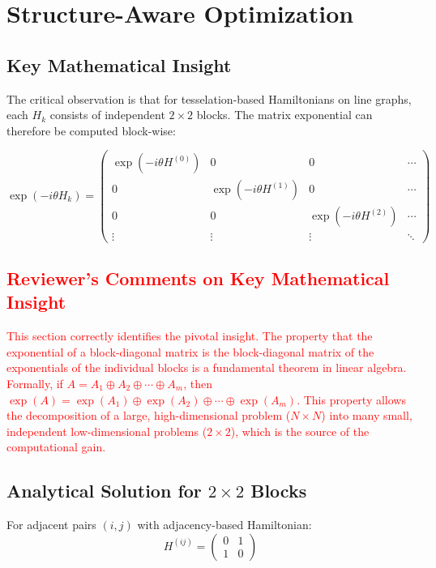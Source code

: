 \documentclass[11pt,a4paper]{article}
\begin{document}
\section{Structure-Aware Optimization}

\subsection{Key Mathematical Insight}

The critical observation is that for tesselation-based Hamiltonians on line graphs, each $H_k$ consists of independent $2\times2$ blocks. The matrix exponential can therefore be computed block-wise:

\begin{equation}
\exp(-i\theta H_k) = \begin{pmatrix}
\exp(-i\theta H^{(0)}) & 0 & 0 & \cdots \\
0 & \exp(-i\theta H^{(1)}) & 0 & \cdots \\
0 & 0 & \exp(-i\theta H^{(2)}) & \cdots \\
\vdots & \vdots & \vdots & \ddots
\end{pmatrix}
\end{equation}

\textcolor{red}{
\subsection*{Reviewer's Comments on Key Mathematical Insight}
This section correctly identifies the pivotal insight. The property that the exponential of a block-diagonal matrix is the block-diagonal matrix of the exponentials of the individual blocks is a fundamental theorem in linear algebra. Formally, if $A = A_1 \oplus A_2 \oplus \cdots \oplus A_m$, then $\exp(A) = \exp(A_1) \oplus \exp(A_2) \oplus \cdots \oplus \exp(A_m)$. This property allows the decomposition of a large, high-dimensional problem ($N \times N$) into many small, independent low-dimensional problems ($2 \times 2$), which is the source of the computational gain.
}

\subsection{Analytical Solution for $2\times2$ Blocks}

For adjacent pairs $(i,j)$ with adjacency-based Hamiltonian:
\begin{equation}
H^{(ij)} = \begin{pmatrix}
0 & 1 \\
1 & 0
\end{pmatrix}
\end{equation}
\end{document}
